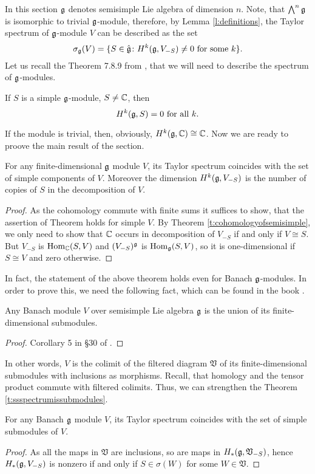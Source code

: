In this section $\mathfrak{g}$ denotes semisimple Lie algebra of dimension $n$. Note, that $\bigwedge^n
\mathfrak{g}$ is isomorphic to trivial $\mathfrak{g}$-module, therefore, by Lemma \ref{l:definitions}, the Taylor
spectrum of $\mathfrak{g}$-module $V$ can be described as the set
\[
    \sigma_{\mathfrak{g}}(V) = \{ S \in \hat{\mathfrak{g}} \colon H^k(\mathfrak{g}, V_{-S})\neq 0 \text{ for some } k\}.
\]
Let us recall the Theorem 7.8.9 from , that we will need to describe the spectrum
of $\mathfrak{g}$-modules.
\begin{theorem} \label{t:cohomologyofsemisimple}
If $S$ is a simple $\mathfrak{g}$-module, $S \neq \mathbb{C}$, then 
\[
    H^k(\mathfrak{g}, S) = 0 \text{ for all } k.
\]
\end{theorem}
If the module is trivial, then, obviously, $H^k(\mathfrak{g}, \mathbb{C}) \cong \mathbb{C}$. Now we are ready to proove
the main result of the section.
\begin{theorem} \label{t:ssspectrumissubmodules}
    For any finite-dimensional $\mathfrak{g}$ module $V$, its Taylor spectrum coincides with the set of
    simple components of $V$. Moreover the dimension $H^k(\mathfrak{g}, V_{-S})$ is the number of copies
    of $S$ in the decomposition of $V$.
\end{theorem}
\begin{proof}
    As the cohomology commute with finite sums it suffices to show, that the assertion of Theorem holds for
    simple $V$. By Theorem \ref{t:cohomologyofsemisimple}, we only need to show that $\mathbb{C}$ occurs
    in decomposition of $V_{-S}$ if and only if $V\cong S$. But $V_{-S}$ is $\operatorname{Hom}_{\mathbb{C}}(S, V)$ and
    $(V_{-S})^{\mathfrak{g}}$ is $\operatorname{Hom}_{\mathfrak{g}}(S, V)$, so it is one-dimensional if $S\cong V$ and zero
    otherwise.
\end{proof}
In fact, the statement of the above theorem holds even for Banach $\mathfrak{g}$-modules. In order to
prove this, we need the following fact, which can be found in the book .

\begin{theorem}
    Any Banach module $V$ over semisimple Lie algebra $\mathfrak{g}$ is the union of its
    finite-dimensional submodules. 
\end{theorem}
\begin{proof}
    Corollary 5 in \S30 of .
\end{proof}
In other words, $V$ is the colimit of the filtered diagram $\mathfrak{V}$ of its finite-dimensional submodules
with inclusions as morphisms. Recall, that homology and the tensor product commute with filtered
colimits. Thus, we can strengthen the Theorem \ref{t:ssspectrumissubmodules}.
\begin{corollary}
    For any Banach $\mathfrak{g}$ module $V$, its Taylor spectrum coincides with the set of
    simple submodules of $V$. 
\end{corollary}
\begin{proof}
    As all the maps in $\mathfrak{V}$ are inclusions, so are maps in $H_*(\mathfrak{g}, \mathfrak{V}_{-S})$,
    hence $H_*(\mathfrak{g}, V_{-S})$ is nonzero if and only if $S \in \sigma(W)$ for some $W\in
    \mathfrak{V}$.
\end{proof}
